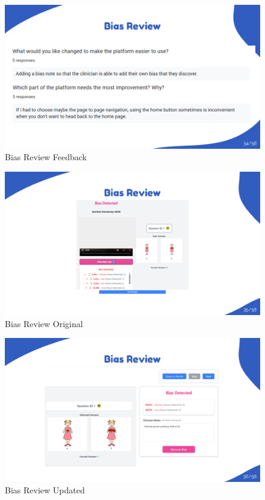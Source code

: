 \documentclass{article}
\begin{document}
\begin{figure}[H]
  \centering
  \includegraphics[width=\textwidth]{images/slide34.png}
  \caption{Bias Review Feedback}
  \label{fig:bias_feedback}
\end{figure}

\begin{figure}[H]
  \centering
  \includegraphics[width=\textwidth]{images/slide35.png}
  \caption{Bias Review Original}
  \label{fig:bias_feedback_original}
\end{figure}

\begin{figure}[H]
  \centering
  \includegraphics[width=\textwidth]{images/slide36.png}
  \caption{Bias Review Updated}
  \label{fig:bias_feedback_new}
\end{figure}
\end{document}
